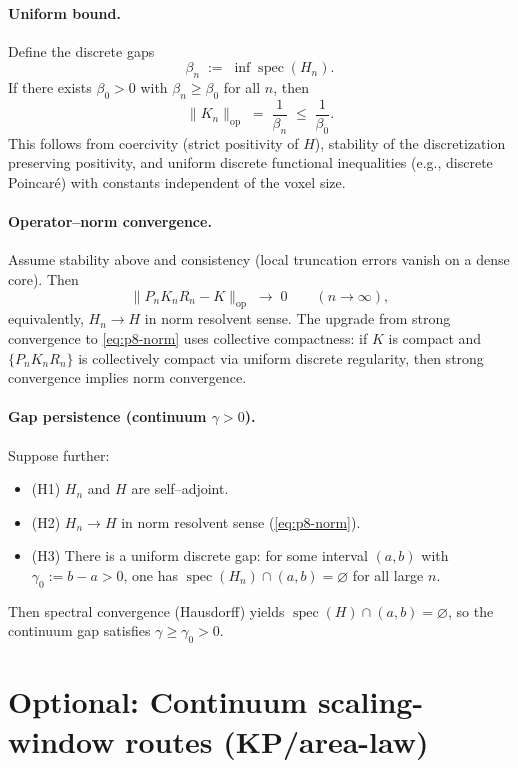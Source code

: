 \documentclass[11pt]{amsart}
\begin{document}
\paragraph{Uniform bound.}
Define the discrete gaps
\[
  \beta_n\;:=\;\inf \operatorname{spec}(H_n).
\]
If there exists $\beta_0>0$ with $\beta_n\ge \beta_0$ for all $n$, then
\[
  \lVert K_n\rVert_{\mathrm{op}}\;=\;\frac{1}{\beta_n}\;\le\;\frac{1}{\beta_0}.
\]
This follows from coercivity (strict positivity of $H$), stability of the discretization preserving positivity, and uniform discrete functional inequalities (e.g., discrete Poincar\'e) with constants independent of the voxel size.

\paragraph{Operator--norm convergence.}
Assume stability above and consistency (local truncation errors vanish on a dense core). Then
\begin{equation}
\label{eq:p8-norm}
  \big\lVert P_n K_n R_n - K\big\rVert_{\mathrm{op}}\;\longrightarrow\;0\qquad (n\to\infty),
\end{equation}
equivalently, $H_n\to H$ in norm resolvent sense. The upgrade from strong convergence to \eqref{eq:p8-norm} uses collective compactness: if $K$ is compact and $\{P_n K_n R_n\}$ is collectively compact via uniform discrete regularity, then strong convergence implies norm convergence.

\paragraph{Gap persistence (continuum $\gamma>0$).}
Suppose further:
\begin{itemize}
  \item (H1) $H_n$ and $H$ are self--adjoint.
  \item (H2) $H_n\to H$ in norm resolvent sense (\eqref{eq:p8-norm}).
  \item (H3) There is a uniform discrete gap: for some interval $(a,b)$ with $\gamma_0:=b-a>0$, one has $\operatorname{spec}(H_n)\cap(a,b)=\varnothing$ for all large $n$.
\end{itemize}
Then spectral convergence (Hausdorff) yields $\operatorname{spec}(H)\cap(a,b)=\varnothing$, so the continuum gap satisfies $\gamma\ge \gamma_0>0$.

\section{Optional: Continuum scaling-window routes (KP/area-law)}
\end{document}
